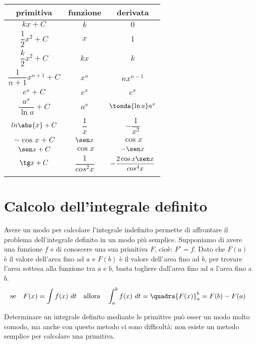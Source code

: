 \begin{center}
\begin{tabular}{ccc}
\toprule
primitiva & \qquad funzione \qquad & derivata\\[6pt]
\midrule
\(k x +C\) & \qquad \(k\) \qquad & \(0\)\\[6pt]
\(\dfrac{1}{2}x^2 +C\) & \qquad \(x\) \qquad & \(1\)\\[6pt]
\(\dfrac{k}{2}x^2 +C\) & \qquad \(kx\) \qquad & \(k\)\\[6pt]
\(\dfrac{1}{n+1}x^{n+1} +C\) & \qquad \(x^n\) \qquad & \(nx^{n-1}\)\\[6pt]
\(e^x +C\) & \qquad \(e^x\) \qquad & \(e^x\)\\[6pt]
\(\dfrac{a^x}{\ln{a}} +C\) & \qquad \(a^x\) \qquad & \(\tonda{\ln{a}} 
a^x\)\\[6pt]
\(ln \abs{x} +C\) & \qquad \(\dfrac{1}{x}\) \qquad & 
\(-\dfrac{1}{x^2}\)\\[6pt]
\(-\cos x +C\) & \qquad \(\sen x\) \qquad & \(\cos x\)\\[6pt]
\(\sen x +C\) & \qquad \(\cos x\) \qquad & \(-\sen x\)\\[6pt]
\(\tg x +C\) & \qquad \(\dfrac{1}{cos^2 x}\) \qquad & 
    \(-\dfrac{2 \cos x \sen x}{cos^4 x}\)\\[6pt]
\(\) & \qquad \(\) \qquad & \(\)\\
\bottomrule
\end{tabular}
\end{center}

\section{Calcolo dell'integrale definito}
\label{sec:integrali_indefiniti}

Avere un modo per calcolare l'integrale indefinito permette di affrontare il 
problema dell'integrale definito in un modo più semplice.
Supponiamo di avere una funzione \(f\) e di conoscere una sua primitiva 
\(F\), cioè: \(F' = f\).
Dato che \(F(a)\) è il valore dell'area fino ad \(a\) e 
\(F(b)\) è il valore dell'area fino ad \(b\), 
per trovare l'area sottesa alla funzione tra \(a\) e \(b\),
basta togliere dall'area fino ad \(a\) l'area fino a \(b\).
\[\text{se} \quad F(x) = \int f(x)~dt \quad \text{allora} \quad 
\int_a^b f(x)~dt = \quadra{F(x)}_a^b = F(b) - F(a)\]

Determinare un integrale definito mediante le primitive può esser un modo 
molto comodo, ma anche con questo metodo ci sono difficoltà: 
non esiste un metodo semplice per calcolare una primitiva.

